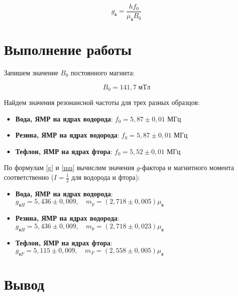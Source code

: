 \documentclass[12pt]{kiarticle}
\begin{document}
	\begin{equation}\label{g}
	g_{я} = \dfrac{hf_0}{\mu_я B_0} 
	\end{equation}

	
	\section{Выполнение работы}
	
	Запишем значение $ B_0 $ постоянного магнита:
	
	\begin{equation}\label{}
	B_0 = 141,7 \; мТл
	\end{equation} 
	
	Найдем значения резонансной частоты для трех разных образцов:
	
	\begin{itemize}
		\item \textbf{Вода, ЯМР на ядрах водорода}: $ f_0 = 5,87 \pm 0,01 $ МГц
			
		\item \textbf{Резина, ЯМР на ядрах водорода}: $ f_0 = 5,87 \pm 0,01 $ МГц
			
		\item \textbf{Тефлон, ЯМР на ядрах фтора}: $ f_0 = 5,52 \pm 0,01 $ МГц
	\end{itemize}
	
	По формулам \eqref{g} и \eqref{mu} вычислим значения $ g $-фактора и магнитного момента соответственно ($ I = \frac{1}{2} $ для водорода и фтора): 
	
	\begin{itemize}
		\item \textbf{Вода, ЯМР на ядрах водорода}: $ g_{яH} = 5,436 \pm 0,009, \quad m_p  = (2,718 \pm 0,005)\mu_я $ 
		
		\item \textbf{Резина, ЯМР на ядрах водорода}: $ g_{яH} = 5,436 \pm 0,009, \quad m_p   = (2,718 \pm 0,023)\mu_я  $ 
		
		\item \textbf{Тефлон, ЯМР на ядрах фтора}: $ g_{яF} = 5,115 \pm 0,009, \quad m_F  = (2,558 \pm 0,005)\mu_я  $ 
	\end{itemize}
	
	\section{Вывод}
	
\end{document}
